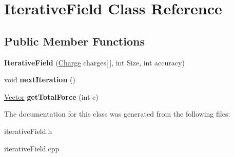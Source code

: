 \hypertarget{classIterativeField}{\section{Iterative\-Field Class Reference}
\label{classIterativeField}
}
\subsection*{Public Member Functions}
\begin{DoxyCompactItemize}
\item 
\hypertarget{classIterativeField_aab896b97271b74bb77790668ce268e69}{{\bfseries Iterative\-Field} (\hyperlink{classCharge}{Charge} charges\mbox{[}$\,$\mbox{]}, int Size, int accuracy)}\label{classIterativeField_aab896b97271b74bb77790668ce268e69}

\item 
\hypertarget{classIterativeField_aaf488b5a2c242b5927d05a9db98f4a63}{void {\bfseries next\-Iteration} ()}\label{classIterativeField_aaf488b5a2c242b5927d05a9db98f4a63}

\item 
\hypertarget{classIterativeField_aa1215bee145a631da2370f4e226eb2ea}{\hyperlink{classVector}{Vector} {\bfseries get\-Total\-Force} (int c)}\label{classIterativeField_aa1215bee145a631da2370f4e226eb2ea}

\end{DoxyCompactItemize}


The documentation for this class was generated from the following files\-:\begin{DoxyCompactItemize}
\item 
iterative\-Field.\-h\item 
iterative\-Field.\-cpp\end{DoxyCompactItemize}

